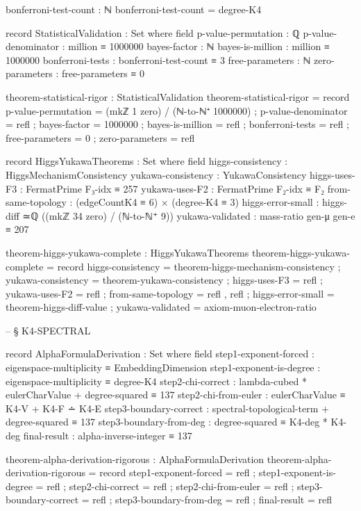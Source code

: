 \documentclass[11pt,a4paper]{book}
\begin{document}
\begin{code}
bonferroni-test-count : ℕ
bonferroni-test-count = degree-K4

record StatisticalValidation : Set where
  field
    p-value-permutation : ℚ
    p-value-denominator : million ≡ 1000000
    bayes-factor : ℕ
    bayes-is-million : million ≡ 1000000
    bonferroni-tests : bonferroni-test-count ≡ 3
    free-parameters : ℕ
    zero-parameters : free-parameters ≡ 0

theorem-statistical-rigor : StatisticalValidation
theorem-statistical-rigor = record
  { p-value-permutation = (mkℤ 1 zero) / (ℕ-to-ℕ⁺ 1000000)
  ; p-value-denominator = refl
  ; bayes-factor = 1000000
  ; bayes-is-million = refl
  ; bonferroni-tests = refl
  ; free-parameters = 0
  ; zero-parameters = refl
  }

record HiggsYukawaTheorems : Set where
  field
    higgs-consistency : HiggsMechanismConsistency
    yukawa-consistency : YukawaConsistency
    higgs-uses-F3 : FermatPrime F₃-idx ≡ 257
    yukawa-uses-F2 : FermatPrime F₂-idx ≡ F₂
    from-same-topology : (edgeCountK4 ≡ 6) × (degree-K4 ≡ 3)
    higgs-error-small : higgs-diff ≃ℚ ((mkℤ 34 zero) / (ℕ-to-ℕ⁺ 9))
    yukawa-validated : mass-ratio gen-μ gen-e ≡ 207

theorem-higgs-yukawa-complete : HiggsYukawaTheorems
theorem-higgs-yukawa-complete = record
  { higgs-consistency = theorem-higgs-mechanism-consistency
  ; yukawa-consistency = theorem-yukawa-consistency
  ; higgs-uses-F3 = refl
  ; yukawa-uses-F2 = refl
  ; from-same-topology = refl , refl
  ; higgs-error-small = theorem-higgs-diff-value
  ; yukawa-validated = axiom-muon-electron-ratio
  }


-- § K4-SPECTRAL

record AlphaFormulaDerivation : Set where
  field
    step1-exponent-forced     : eigenspace-multiplicity ≡ EmbeddingDimension
    step1-exponent-is-degree  : eigenspace-multiplicity ≡ degree-K4
    step2-chi-correct         : lambda-cubed * eulerCharValue + degree-squared ≡ 137
    step2-chi-from-euler      : eulerCharValue ≡ K4-V + K4-F ∸ K4-E
    step3-boundary-correct    : spectral-topological-term + degree-squared ≡ 137
    step3-boundary-from-deg   : degree-squared ≡ K4-deg * K4-deg
    final-result              : alpha-inverse-integer ≡ 137

theorem-alpha-derivation-rigorous : AlphaFormulaDerivation
theorem-alpha-derivation-rigorous = record
  { step1-exponent-forced   = refl
  ; step1-exponent-is-degree = refl
  ; step2-chi-correct       = refl
  ; step2-chi-from-euler    = refl
  ; step3-boundary-correct  = refl
  ; step3-boundary-from-deg = refl
  ; final-result            = refl
  }


\end{code}
\end{document}
